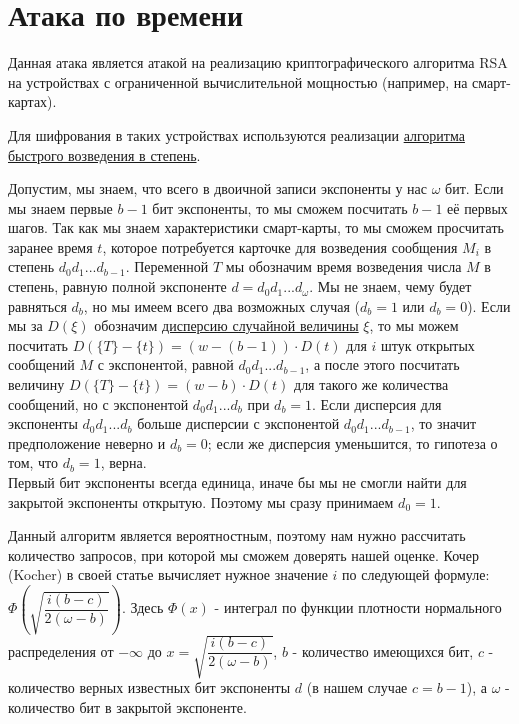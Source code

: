 \documentclass[12pt,a4paper]{scrartcl}
\begin{document}
\section{Атака по времени}

Данная атака является атакой на реализацию криптографического алгоритма RSA на устройствах с ограниченной вычислительной мощностью (например, на смарт-картах). 

Для шифрования в таких устройствах используются реализации \href{https://yatb.kksctf.ru/}{алгоритма быстрого возведения в степень}.

Допустим, мы знаем, что всего в двоичной записи экспоненты у нас $\omega$ бит. Если мы знаем первые $b-1$ бит экспоненты, то мы сможем посчитать $b-1$ её первых шагов. Так как мы знаем характеристики смарт-карты, то мы сможем просчитать заранее время $t$, которое потребуется карточке для возведения сообщения $M_i$ в степень $d_0d_1...d_{b-1}$. Переменной $T$ мы обозначим время возведения числа $M$ в степень, равную полной экспоненте $d=d_0d_1...d_{\omega}$. Мы не знаем, чему будет равняться $d_{b}$, но мы имеем всего два возможных случая ($d_{b}=1$ или $d_{b}=0$). Если мы за $D(\xi)$ обозначим \href{https://yatb.kksctf.ru/}{дисперсию случайной величины} $\xi$, то мы можем посчитать $D(\{T\}-\{t\}) = (w-(b-1))\cdot D(t)$ для $i$ штук открытых сообщений $M$ с экспонентой, равной $d_0d_1...d_{b-1}$, а после этого посчитать величину $D(\{T\}-\{t\}) = (w-b)\cdot D(t)$ для такого же количества сообщений, но с экспонентой $d_0d_1...d_{b}$ при $d_{b}=1$. Если дисперсия для экспоненты $d_0d_1...d_{b}$ больше дисперсии с экспонентой $d_0d_1...d_{b-1}$, то значит предположение неверно и $d_{b}=0$; если же дисперсия уменьшится, то гипотеза о том, что $d_{b}=1$, верна.\\

Первый бит экспоненты всегда единица, иначе бы мы не смогли найти для закрытой экспоненты открытую. Поэтому мы сразу принимаем $d_{0}=1$.

Данный алгоритм является вероятностным, поэтому нам нужно рассчитать количество запросов, при которой мы сможем доверять нашей оценке. Кочер (Kocher) в своей статье вычисляет нужное значение $i$ по следующей формуле:  $\Phi\left(\sqrt{\dfrac{i(b-c)}{2(\omega - b)}}\right)$. Здесь $\Phi(x)$ - интеграл по функции плотности нормального распределения от $-\infty$ до $x=\sqrt{\dfrac{i(b-c)}{2(\omega - b)}}$, $b$ - количество имеющихся бит, $c$ - количество верных известных бит экспоненты $d$ (в нашем случае $c=b-1$), а $\omega$ - количество бит в закрытой экспоненте.
\end{document}
